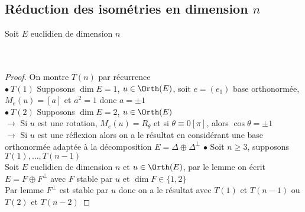 	\subsection{Réduction des isométries en dimension $n$}
		Soit $E$ euclidien de dimension $n$
		\vspace*{0.5cm} \\ 
		\vspace*{0.5cm} \\ 
		\vspace*{0.5cm} \\ 
		\begin{proof}
		On montre $T(n)$ par récurrence\\
		$\bullet ~ T(1)$ Supposons $\dim E =1$, $u\in \Orth(E)$, soit $e=(e_1)$ base orthonormée, $M_e(u) = [a]$ et $a^2=1$ donc $a = \pm 1$\\
		$\bullet ~ T(2)$ Supposons $\dim E = 2$, $u\in \Orth(E)$\\
		$\rightarrow$ Si $u$ est une rotation, $M_e(u) = R_\theta$ et si $\theta \equiv 0[\pi]$, alors $\cos\theta = \pm 1$\\
		$\rightarrow$ Si $u$ est une réflexion alors on a le résultat en considérant une base orthonormée adaptée à la décomposition $E=\Delta\oplus\Delta^\perp$
		$\bullet$ Soit $n\geqslant 3$, supposons $T(1),\dots , T(n-1)$ \\
		Soit $E$ euclidien de dimension $n$ et $u\in\Orth(E)$, par le lemme on écrit $E=F\oplus F^\perp$ avec $F$ stable par $u$ et $\dim F\in \{1,2\}$\\
		Par lemme $F^\perp$ est stable par $u$ donc on a le résultat avec $T(1)$ et $T(n-1)$ ou $T(2)$ et $T(n-2)$
		\end{proof}
